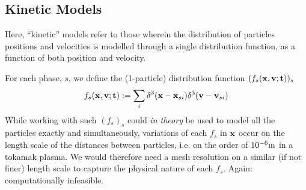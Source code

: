 \subsection*{Kinetic Models}
    \begin{definition}
        Here, ``kinetic'' models refer to those wherein the distribution of particles positions and velocities is modelled through a single distribution function, as a function of both position and velocity.
    \end{definition}
    For each phase, $s$, we define the (1-particle) distribution function $(f_{s}(\mathbf{x}, \mathbf{v}; \mathbf{t}))_{s}$
    \begin{equation}
        f_{s}(\mathbf{x}, \mathbf{v}; \mathbf{t})  :=  \sum_{i}\delta^{3}(\mathbf{x} - \mathbf{x}_{si})\delta^{3}(\mathbf{v} - \mathbf{v}_{si})
    \end{equation}
    While working with such $(f_{s})_{s}$ could \emph{in theory} be used to model all the particles exactly and simultaneously, variations of each $f_{s}$ in $\mathbf{x}$ occur on the length scale of the distances between particles, i.e. on the order of $10^{- 6}\mathrm{m}$ in a tokamak plasma. We would therefore need a mesh resolution on a similar (if not finer) length scale to capture the physical nature of each $f_{s}$. Again: computationally infeasible.

